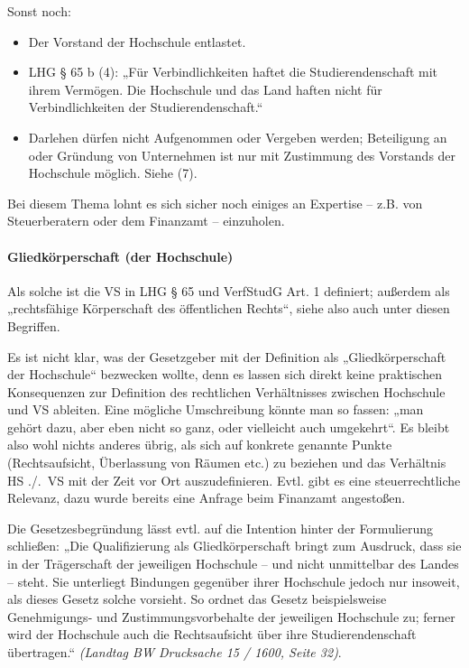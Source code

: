 \documentclass[
10pt,
a4paper,
twoside,								%
titlepage=false,							%
draft=false								%
]{scrartcl}
\begin{document}
Sonst noch:
\begin{itemize}
	\item Der Vorstand der Hochschule entlastet.
	\item LHG § 65 b (4): „Für Verbindlichkeiten haftet die Studierendenschaft mit ihrem Vermögen. Die Hochschule und das Land haften nicht für Verbindlichkeiten der Studierendenschaft.“
	\item Darlehen dürfen nicht Aufgenommen oder Vergeben werden; Beteiligung an oder Gründung von Unternehmen ist nur mit Zustimmung des Vorstands der Hochschule möglich. Siehe (7).
\end{itemize}

Bei diesem Thema lohnt es sich sicher noch einiges an Expertise – z.B. von Steuerberatern oder dem Finanzamt – einzuholen.



\paragraph{Gliedkörperschaft (der Hochschule)}

Als solche ist die VS in LHG § 65 und VerfStudG Art. 1 definiert; außerdem als „rechtsfähige Körperschaft des öffentlichen Rechts“, siehe also auch unter diesen Begriffen.

Es ist nicht klar, was der Gesetzgeber mit der Definition als „Gliedkörperschaft der Hochschule“ bezwecken wollte, denn es lassen sich direkt keine praktischen Konsequenzen zur Definition des rechtlichen Verhältnisses zwischen Hochschule und VS ableiten. Eine mögliche Umschreibung könnte man so fassen: „man gehört dazu, aber eben nicht so ganz, oder vielleicht auch umgekehrt“. Es bleibt also wohl nichts anderes übrig, als sich auf konkrete genannte Punkte (Rechtsaufsicht, Überlassung von Räumen etc.) zu beziehen und das Verhältnis HS ./.~VS mit der Zeit vor Ort auszudefinieren. Evtl. gibt es eine steuerrechtliche Relevanz, dazu wurde bereits eine Anfrage beim Finanzamt angestoßen.

Die Gesetzesbegründung lässt evtl. auf die Intention hinter der Formulierung schließen: „Die Qualifizierung als Gliedkörperschaft bringt zum Ausdruck, dass sie in der Trägerschaft der jeweiligen Hochschule – und nicht unmittelbar des Landes – steht. Sie unterliegt Bindungen gegenüber ihrer Hochschule jedoch nur insoweit, als dieses Gesetz solche vorsieht. So ordnet das Gesetz beispielsweise Genehmigungs- und Zustimmungsvorbehalte der jeweiligen Hochschule zu; ferner wird der Hochschule auch die Rechtsaufsicht über ihre Studierendenschaft übertragen.“ \textit{(Landtag BW Drucksache 15 / 1600, Seite 32)}.
\end{document}
